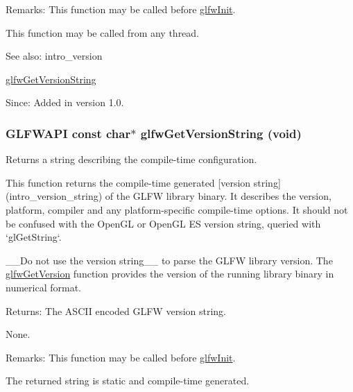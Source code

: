 \begin{Desc}
\item[Remarks:]This function may be called before \hyperlink{group__init_gb41771f0215a2e0afb4cf1cf98082d40}{glfwInit}.\end{Desc}
This function may be called from any thread.

\begin{Desc}
\item[See also:]intro\_\-version 

\hyperlink{group__init_g4b9092ac5eace57d94d3cd551d6b8ded}{glfwGetVersionString}\end{Desc}
\begin{Desc}
\item[Since:]Added in version 1.0. \end{Desc}
\hypertarget{group__init_g4b9092ac5eace57d94d3cd551d6b8ded}{
\subsubsection[glfwGetVersionString]{\setlength{\rightskip}{0pt plus 5cm}GLFWAPI const char$\ast$ glfwGetVersionString (void)}}
\label{group__init_g4b9092ac5eace57d94d3cd551d6b8ded}


Returns a string describing the compile-time configuration. 

This function returns the compile-time generated \mbox{[}version string\mbox{]}(intro\_\-version\_\-string) of the GLFW library binary. It describes the version, platform, compiler and any platform-specific compile-time options. It should not be confused with the OpenGL or OpenGL ES version string, queried with `glGetString`.

\_\-\_\-Do not use the version string\_\-\_\- to parse the GLFW library version. The \hyperlink{group__init_g2402c7824ac0194c13722790ff9559ff}{glfwGetVersion} function provides the version of the running library binary in numerical format.

\begin{Desc}
\item[Returns:]The ASCII encoded GLFW version string.\end{Desc}
None.

\begin{Desc}
\item[Remarks:]This function may be called before \hyperlink{group__init_gb41771f0215a2e0afb4cf1cf98082d40}{glfwInit}.\end{Desc}
The returned string is static and compile-time generated.

